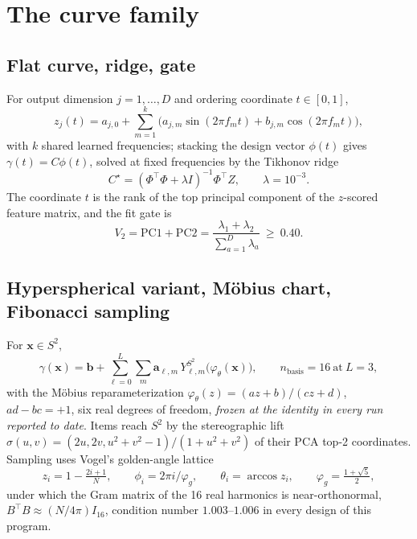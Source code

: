 \documentclass[11pt,a4paper]{article}
\theoremstyle{plain}
\theoremstyle{remark}
\begin{document}
\section{The curve family}
\label{sec:family}

\subsection{Flat curve, ridge, gate}
For output dimension $j=1,\dots,D$ and ordering coordinate $t\in[0,1]$,
\begin{equation}
z_j(t)=a_{j,0}+\sum_{m=1}^{k}\big(a_{j,m}\sin(2\pi f_mt)+b_{j,m}\cos(2\pi f_mt)\big),\tag{1}
\end{equation}
with $k$ shared learned frequencies; stacking the design vector $\phi(t)$ gives $\gamma(t)=C\phi(t)$, solved at fixed frequencies by the Tikhonov ridge
\begin{equation}
C^{\star}=(\Phi^{\top}\Phi+\lambda I)^{-1}\Phi^{\top}Z,\qquad\lambda=10^{-3}.\tag{2}
\end{equation}
The coordinate $t$ is the rank of the top principal component of the $z$-scored feature matrix, and the fit gate is
\begin{equation}
V_2=\mathrm{PC1}+\mathrm{PC2}=\frac{\lambda_1+\lambda_2}{\sum_{a=1}^{D}\lambda_a}\ \ge\ 0.40 .\tag{3}
\end{equation}

\subsection{Hyperspherical variant, M\"obius chart, Fibonacci sampling}
For $\mathbf{x}\in S^2$,
\begin{equation}
\gamma(\mathbf{x})=\mathbf{b}+\sum_{\ell=0}^{L}\sum_{m}\mathbf{a}_{\ell,m}\,Y^{S^2}_{\ell,m}\!\big(\varphi_\theta(\mathbf{x})\big),\qquad n_{\mathrm{basis}}=16\ \text{at}\ L=3,\tag{4}
\end{equation}
with the M\"obius reparameterization $\varphi_\theta(z)=(az+b)/(cz+d)$, $ad-bc=+1$, six real degrees of freedom, \emph{frozen at the identity in every run reported to date}. Items reach $S^2$ by the stereographic lift $\sigma(u,v)=(2u,2v,u^2+v^2-1)/(1+u^2+v^2)$ of their PCA top-2 coordinates. Sampling uses Vogel's golden-angle lattice
\begin{equation}
z_i=1-\tfrac{2i+1}{N},\qquad\phi_i=2\pi i/\varphi_g,\qquad\theta_i=\arccos z_i,\qquad\varphi_g=\tfrac{1+\sqrt5}{2},\tag{5}
\end{equation}
under which the Gram matrix of the 16 real harmonics is near-orthonormal, $B^{\top}B\approx(N/4\pi)I_{16}$, condition number $1.003$--$1.006$ in every design of this program.
\end{document}

